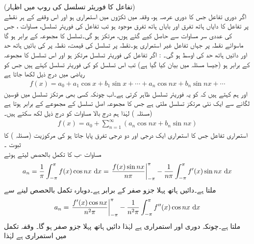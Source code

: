 \quad (تفاعل کا فوریئر تسلسل کی روپ میں اظہار)\\
اگر دوری تفاعل  جس کا دوری عرصہ  ہو، وقفہ  میں ٹکڑوں میں استمراری ہو اور اس وقفے کے ہر نقطے پر تفاعل کا دایاں ہاتھ تفرق اور بایاں ہاتھ تفرق موجود ہو تب  تفاعل کی فوریئر تسلسل، مساوات ، جس  کی عددی سر  مساوات  سے حاصل کیے گئے ہوں، مرتکز ہو گی۔تسلسل کا مجموعہ  کے برابر ہو گا ماسوائے  نقطہ  پر جہاں تفاعل غیر استمراری ہو۔نقطہ  پر تسلسل کی قیمت،  نقطہ  پر  کی بائیں ہاتھ حد اور دائیں ہاتھ حد کی اوسط ہو گی۔ 
: اگر تفاعل  کی فوریئر تسلسل مرتکز ہو اور اس تسلسل کا مجموعہ  کے برابر ہو  (جیسا مسئلہ  میں بیان کیا گیا ہے) تب اس تسلسل کو  کی فوریئر تسلسل کہتے ہیں جس کو ریاضی میں درج ذیل لکھا جاتا ہے
\begin{align*}
f(x)=a_0+a_1\cos x+b_1\sin x+\cdots+a_n\cos nx+b_n\sin nx+\cdots
\end{align*} 
اور ہم کہتے ہیں کہ  کو یہ فوریئر تسلسل ظاہر کرتی ہے۔اب چونکہ کسی بھی مرتکز تسلسل میں قوسین لگانے سے  ایک نئی مرتکز تسلسل ملتی ہے جس کا مجموعہ اصل تسلسل کے مجموعے کے برابر ہوتا ہے (مسئلہ ) لہٰذا ہم درج بالا مساوات کو درج ذیل لکھ سکتے ہیں۔
\begin{align*}
f(x)=a_0+\sum_{n=1}^{\infty}(a_n\cos nx+b_n\sin nx)
\end{align*}
\quad استمراری تفاعل  جس کا استمراری ایک درجی اور دو درجی تفرق پایا جاتا ہو کی مرکوزیت  (مسئلہ ) کا ثبوت ۔\\
مساوات -ب  کا تکمل بالحصص لیتے ہوئے
\begin{align*}
a_n=\frac{1}{\pi}\int_{-\pi}^{\pi}f(x)\cos nx \,\dif x=\left. \frac{f(x)\sin nx}{n\pi}\right|_{-\pi}^{\pi}-\frac{1}{n\pi}\int_{-\pi}^{\pi} f'(x)\sin nx\,\dif x
\end{align*}
ملتا ہے۔دائیں ہاتھ پہلا جزو صفر کے برابر ہے۔دوبارہ تکمل بالحصص لینے سے
\begin{align*}
a_n=\left.\frac{f'(x)\cos nx}{n^2\pi}\right|_{-\pi}^{\pi}-\frac{1}{n^2\pi}\int_{-\pi}^{\pi} f''(x)\cos nx\, \dif x
\end{align*}
ملتا ہے۔چونکہ   دوری اور استمراری ہے لہٰذا دائیں ہاتھ پہلا جزو صفر ہو گا۔ وقفہ تکمل  میں  استمراری ہے لہٰذا 
